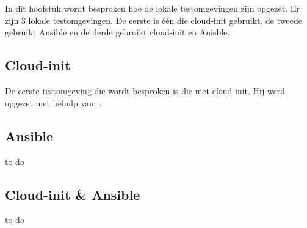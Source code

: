 \chapter{}
\label{ch:testlokaal}

In dit hoofstuk wordt besproken hoe de lokale testomgevingen zijn opgezet. Er zijn 3 lokale testomgevingen. De eerste is één die cloud-init gebruikt, de tweede gebruikt Ansible en de derde gebruikt cloud-init en Anisble.

\section{Cloud-init}
De eerste testomgeving die wordt besproken is die met cloud-init. Hij werd opgezet met behulp van: \autocite{cloudVagrant}.

\section{Ansible}
to do

\section{Cloud-init \& Ansible }
to do